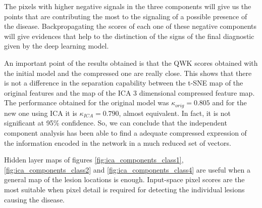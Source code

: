 \documentclass[review]{elsarticle}
\theoremstyle{definition} %
\theoremstyle{remark}
\begin{document}
The pixels with higher negative signals in the three components will give us the points that are contributing the most to the signaling of a possible presence of the disease. Backpropagating the scores of each one of these negative components will give evidences that help to the distinction of the signs of the final diagnostic given by the deep learning model.

An important point of the results obtained is that the QWK scores obtained with the initial model and the compressed one are really close. This shows that there is not a difference in the separation capability between the t-SNE map of the original features and the map of the ICA 3 dimensional compressed feature map. The performance obtained for the original model was $\kappa_{orig} = 0.805$ and for the new one using ICA it is $\kappa_{ICA} = 0.790$, almost equivalent. In fact, it is not significant at 95\% confidence. So, we can conclude that the independent component analysis has been able to find a adequate compressed expression of the information encoded in the network in a much reduced set of vectors.


 Hidden layer maps of figures \ref{fig:ica_components_class1}, \ref{fig:ica_components_class2} and \ref{fig:ica_components_class4} are useful when a general map of the lesion locations is enough. Input-space pixel scores are the most suitable when pixel detail is required for detecting the individual lesions causing the disease.

\end{document}
